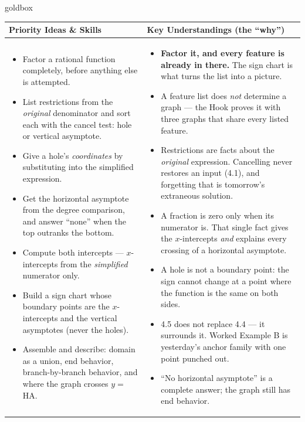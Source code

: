 \documentclass[10pt]{article}
\begin{document}
\renewcommand{\arraystretch}{1.4}
\begin{skillbox}{goldbox}
\begin{tabularx}{\linewidth}{@{}X|X@{}}
\textbf{Priority Ideas \& Skills} & \textbf{Key Understandings (the ``why'')} \\[2pt]
\hline
\vspace{-6pt}
\begin{itemize}[leftmargin=1.1em, nosep, after=\vspace{2pt}]
  \item Factor a rational function completely, before anything else is attempted.
  \item List restrictions from the \emph{original} denominator and sort each with the cancel test: hole or vertical asymptote.
  \item Give a hole's \emph{coordinates} by substituting into the simplified expression.
  \item Get the horizontal asymptote from the degree comparison, and answer ``none'' when the top outranks the bottom.
  \item Compute both intercepts --- $x$-intercepts from the \emph{simplified} numerator only.
  \item Build a sign chart whose boundary points are the $x$-intercepts and the vertical asymptotes (never the holes).
  \item Assemble and describe: domain as a union, end behavior, branch-by-branch behavior, and where the graph crosses $y=$ HA.
\end{itemize}
&
\vspace{-6pt}
\begin{itemize}[leftmargin=1.1em, nosep, after=\vspace{2pt}]
  \item \textbf{Factor it, and every feature is already in there.} The sign chart is what turns the list into a picture.
  \item A feature list does \emph{not} determine a graph --- the Hook proves it with three graphs that share every listed feature.
  \item Restrictions are facts about the \emph{original} expression. Cancelling never restores an input (4.1), and forgetting that is tomorrow's extraneous solution.
  \item A fraction is zero only when its numerator is. That single fact gives the $x$-intercepts \emph{and} explains every crossing of a horizontal asymptote.
  \item A hole is not a boundary point: the sign cannot change at a point where the function is the same on both sides.
  \item 4.5 does not replace 4.4 --- it surrounds it. Worked Example B is yesterday's anchor family with one point punched out.
  \item ``No horizontal asymptote'' is a complete answer; the graph still has end behavior.
\end{itemize}
\end{tabularx}
\end{skillbox}
\end{document}
